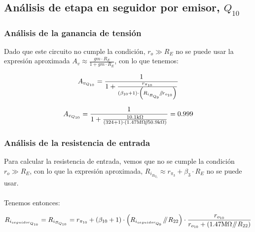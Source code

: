 
\label{section:switch_small_signal_begin}

\subsection{Análisis de etapa en seguidor por emisor, $Q_{10}$}

\subsubsection{Análisis de la ganancia de tensión}

Dado que este circuito no cumple la condición, $r_{o} \gg R_{E}$ no se puede usar la expresión aproximada $A_{v} \approx \frac{gm \cdot R_{E}}{1 + gm \cdot R_{E}}$, con lo que tenemos:

\begin{equation}
A_{v_{Q_{10}}} = \frac{1}{1 + \frac{r_{\pi_{10}}}{  \left(  \beta_{10} + 1 \right) \cdot \left(  R_{i_{B_{Q_{9}}}} \parallelresistors r_{o_{10}}  \right)  } }
\end{equation}

\begin{equation*}
A_{v_{Q_{10}}} = \frac{1}{1 + \frac{10.1 \si[per-mode=symbol]{\kilo\ohm}}{  \left(  324 + 1 \right) \cdot \left(  1.47 \si[per-mode=symbol]{\mega\ohm} \parallelresistors 50.9 \si[per-mode=symbol]{\kilo\ohm}  \right)  } } = 0.999
\end{equation*}


\subsubsection{Análisis de la resistencia de entrada}

Para calcular la  resistencia de entrada, vemos que no se cumple la condición $r_{o} \gg R_{E}$, con lo que la expresión aproximada, $ R_{i_{B_{Q_{3}}}} \approx r_{\pi_{3}} + \beta_{3} \cdot R_{E}$ no se puede usar.\\ \\

Tenemos entonces:

\begin{equation}
R_{i_{seguidor_{Q_{10}}}} = R_{i_{B_{Q_{10}}}} = r_{\pi_{10}} + \left( \beta_{10} + 1 \right) \cdot  \left(  R_{i_{seguidor_{Q_{9}}}} \parallelresistors R_{22}   \right)  \cdot \frac{  r_{o_{10}} }{  r_{o_{10}} + \left(  1.47 \si[per-mode=symbol]{\mega\ohm} \parallelresistors R_{22}   \right)  }
\end{equation}


